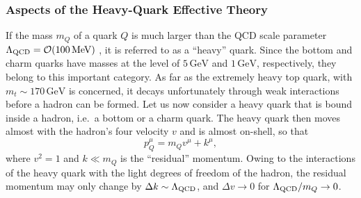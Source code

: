 \documentclass[11pt]{cernrep}
\begin{document}
%
%
%
\subsubsection{Aspects of the Heavy-Quark Effective Theory}
%
%
%
If the mass $m_Q$ of a quark $Q$ is much larger than the QCD scale parameter
$\Lambda_{\rm QCD}={\cal O}(100\,\mbox{MeV})$ \cite{ecker}, it is referred to as 
a ``heavy'' quark. Since the bottom and charm quarks have masses at the 
level of $5\,\mbox{GeV}$ and $1\,\mbox{GeV}$, respectively, they belong 
to this important category. As far as the extremely heavy top quark, 
with $m_t\sim 170\,\mbox{GeV}$ is concerned, it decays unfortunately 
through weak interactions before a hadron can be formed. Let us now 
consider a heavy quark that is bound inside a hadron, i.e.\ a bottom 
or a charm quark. The heavy quark then moves almost with the 
hadron's four velocity $v$ and is almost on-shell, so that
\begin{equation}
p_Q^\mu=m_Qv^\mu + k^\mu,
\end{equation}
where $v^2=1$ and $k\ll m_Q$ is the ``residual'' momentum. Owing to 
the interactions of the heavy quark with the light degrees of freedom of 
the hadron, the residual momentum may only change by 
$\Delta k\sim\Lambda_{\rm QCD}$, and $\Delta v \to 0$ for 
$\Lambda_{\rm QCD}/m_Q\to 0$. 
\end{document}
